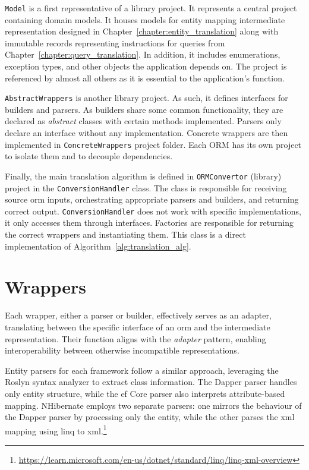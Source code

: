 \texttt{Model} is a first representative of a library project. It represents a central project containing domain models. It houses models for entity mapping intermediate representation designed in Chapter~\ref{chapter:entity_translation} along with immutable records representing instructions for queries from Chapter~\ref{chapter:query_translation}. In addition, it includes enumerations, exception types, and other objects the application depends on. The project is referenced by almost all others as it is essential to the application's function.

\texttt{AbstractWrappers} is another library project. As such, it defines interfaces for builders and parsers. As builders share some common functionality, they are declared as \textit{abstract} classes with certain methods implemented. Parsers only declare an interface without any implementation. Concrete wrappers are then implemented in \texttt{ConcreteWrappers} project folder. Each ORM has its own project to isolate them and to decouple dependencies.

Finally, the main translation algorithm is defined in \texttt{ORMConvertor} (library) project in the \texttt{ConversionHandler} class. The class is responsible for receiving source \acrshort{orm} inputs, orchestrating appropriate parsers and builders, and returning correct output. \texttt{ConversionHandler} does not work with specific implementations, it only accesses them through interfaces. Factories are responsible for returning the correct wrappers and instantiating them. This class is a direct implementation of Algorithm~\ref{alg:translation_alg}.

\section{Wrappers}
Each wrapper, either a parser or builder, effectively serves as an adapter, translating between the specific interface of an \acrshort{orm} and the intermediate representation. Their function aligns with the \textit{adapter} pattern, enabling interoperability between otherwise incompatible representations.

Entity parsers for each framework follow a similar approach, leveraging the Roslyn syntax analyzer to extract class information. The Dapper parser handles only entity structure, while the \acrshort{ef} Core parser also interprets attribute-based mapping. NHibernate employs two separate parsers: one mirrors the behaviour of the Dapper parser by processing only the entity, while the other parses the \acrshort{xml} mapping using \acrshort{linq} to \acrshort{xml}.\footnote{\url{https://learn.microsoft.com/en-us/dotnet/standard/linq/linq-xml-overview}}


